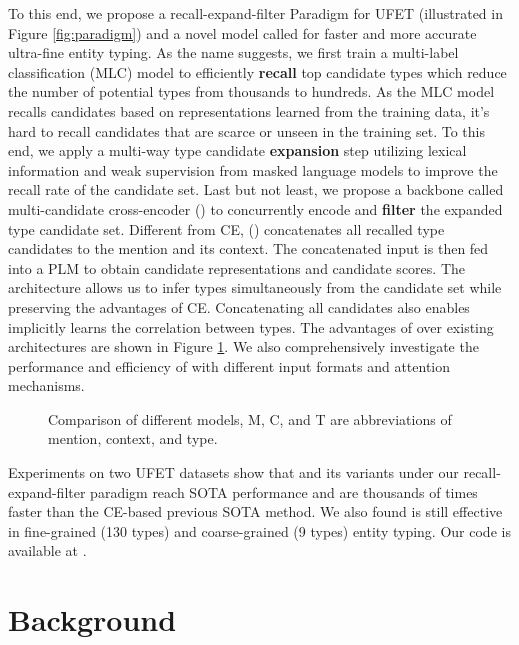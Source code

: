 \documentclass[11pt]{article}
\begin{document}
To this end, we propose a recall-expand-filter Paradigm for UFET (illustrated in Figure \ref{fig:paradigm}) and a novel model called {\bf \textsc{\name}} for faster and more accurate ultra-fine entity typing. As the name suggests, we first train a multi-label classification (MLC) model to efficiently \textbf{recall} top  candidate types which reduce the number of potential types from thousands to hundreds. As the MLC model recalls candidates based on representations learned from the training data, it's hard to recall candidates that are scarce or unseen in the training set. To this end, we apply a multi-way type candidate \textbf{expansion} step utilizing lexical information and weak supervision from masked language models \cite{mlmet} to improve the recall rate of the candidate set. Last but not least, we propose a backbone called multi-candidate cross-encoder ({\bf \textsc{\name}}) to concurrently encode and \textbf{filter} the expanded type candidate set. Different from CE,  ({\bf \textsc{\name}}) concatenates all recalled type candidates to the mention and its context. The concatenated input is then fed into a PLM to obtain candidate representations and candidate scores. The {\bf \textsc{\name}} architecture allows us to infer types simultaneously from the candidate set while preserving the advantages of CE. Concatenating all candidates also enables {\bf \textsc{\name}} implicitly learns the correlation between types. The advantages of {\bf \textsc{\name}} over existing architectures are shown in Figure \ref{fig:adv}. We also comprehensively investigate the performance and efficiency of {\bf \textsc{\name}} with different input formats and attention mechanisms.

\begin{figure}[t]
    \centering
    \caption{Comparison of different models, M, C, and T are abbreviations of mention, context, and type.}
    \label{fig:adv}
\end{figure}

Experiments on two UFET datasets show that {\bf \textsc{\name}} and its variants under our recall-expand-filter paradigm reach SOTA performance and are thousands of times faster than the CE-based previous SOTA method. We also found {\bf \textsc{\name}} is still effective in fine-grained (130 types) and coarse-grained (9 types) entity typing. Our code is available at \code.
 \section{Background}
\end{document}

